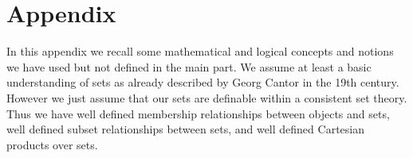 

\chapter{Appendix}



In this appendix we recall some mathematical and logical concepts and notions 
we have used but not defined in the main part.
We assume at least a {\myem basic} understanding of sets as already 
described by Georg Cantor in the 19th century. 
However we just assume that our sets are definable within a consistent set theory.
Thus we have well defined {\myem membership} relationships between objects and sets,
well defined {\myem subset} relationships between sets, 
and well defined {\myem Cartesian products} over sets.












